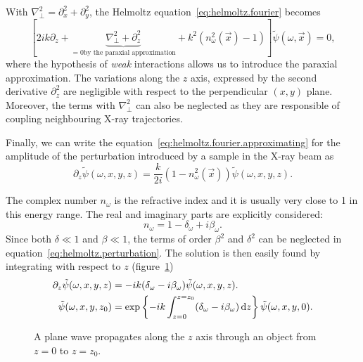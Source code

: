 With  $\nabla_\perp^2 = \partial_x^2 + \partial_y^2$, the Helmoltz
equation~\eqref{eq:helmoltz.fourier} becomes
\begin{equation}
    \left[ 2ik \partial_z + \underbrace{\nabla_\perp^2 +
    \partial^2_z}_{=0 \text{by the paraxial approximation}} + k^2 (n^2_\omega(\vec{x}) - 1)
\right]\tilde{\psi}(\omega, \vec{x}) = 0,
\label{eq:helmoltz.fourier.approssimating}
\end{equation}
where the hypothesis of \emph{weak} interactions allows us to introduce the paraxial
approximation. The variations along the $z$ axis, expressed by the
second derivative $\partial_z^2$ are negligible with
respect to the perpendicular $(x,y)$ plane. Moreover, the terms with
$\nabla_\perp^2$ can also be neglected as they are responsible of coupling
neighbouring X-ray trajectories.

Finally, we can write the equation~\eqref{eq:helmoltz.fourier.approximating}
for the amplitude of the perturbation introduced by a sample in the X-ray
beam as
\begin{equation}
    \partial_z \tilde{\psi}(\omega, x, y, z) =
    \frac{k}{2i}(1 - n^2_\omega(\vec{x}))\tilde{\psi}(\omega, x, y, z).
    \label{eq:helmoltz.perturbation}
\end{equation}

The complex number $n_\omega$ is the refractive index and it is usually
very close to 1 in this energy range. The real and imaginary parts are
explicitly considered:
\begin{equation}
    n_\omega = 1 - \delta_\omega + i\beta_\omega.
\end{equation}
Since both $\delta \ll 1$ and $\beta \ll 1$, the terms of order $\beta^2$ and
$\delta^2$ can be neglected in equation~\eqref{eq:helmoltz.perturbation}.
The solution is then easily found by integrating with respect to $z$
(figure~\ref{fig:propagation})
\begin{align}
    \partial_z \tilde{\psi}(\omega, x, y, z) &=
    -ik(\delta_\omega -i\beta_\omega)\tilde{\psi}(\omega, x, y, z).\\
    \tilde{\psi}(\omega, x, y, z_0) &= \exp\left\{-ik\int_{z=0}^{z=z_0}(\delta_\omega - i
\beta_\omega) \operatorname{d}\!{z} \right\} \tilde{\psi}(\omega, x, y, 0).
\label{eq:helmoltz.solution}
\end{align}

\begin{figure}[htb]
    \centering
    
    \caption[Plane wave propagation.]{A plane wave propagates along the $z$
        axis through an object from $z = 0$ to $z = z_0$.}
    \label{fig:propagation}
\end{figure}

